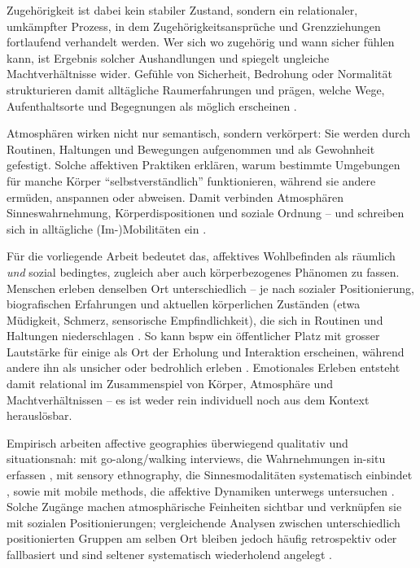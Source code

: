 Zugehörigkeit ist dabei kein stabiler Zustand, sondern ein relationaler, umkämpfter Prozess, in dem Zugehörigkeitsansprüche und Grenzziehungen fortlaufend verhandelt werden. Wer sich wo zugehörig und wann sicher fühlen kann, ist Ergebnis solcher Aushandlungen und spiegelt ungleiche Machtverhältnisse wider. Gefühle von Sicherheit, Bedrohung oder Normalität strukturieren damit alltägliche Raumerfahrungen und prägen, welche Wege, Aufenthaltsorte und Begegnungen als möglich erscheinen \parencite{antonsichSearchingBelongingAnalytical2010,painGlobalizedFearEmotional2009}.

Atmosphären wirken nicht nur semantisch, sondern verkörpert: Sie werden durch Routinen, Haltungen und Bewegungen aufgenommen und als Gewohnheit gefestigt. Solche affektiven Praktiken erklären, warum bestimmte Umgebungen für manche Körper \enquote{selbstverständlich} funktionieren, während sie andere ermüden, anspannen oder abweisen. Damit verbinden Atmosphären Sinneswahrnehmung, Körperdispositionen und soziale Ordnung -- und schreiben sich in alltägliche (Im-)Mobilitäten ein \parencite{mccormackEngineeringAffectiveAtmospheres2008,bissellPassengerMobilitiesAffective2010}.

Für die vorliegende Arbeit bedeutet das, affektives Wohlbefinden als räumlich \emph{und} sozial bedingtes, zugleich aber auch körperbezogenes Phänomen zu fassen. Menschen erleben denselben Ort unterschiedlich -- je nach sozialer Positionierung, biografischen Erfahrungen und aktuellen körperlichen Zuständen (etwa Müdigkeit, Schmerz, sensorische Empfindlichkeit), die sich in Routinen und Haltungen niederschlagen \parencite{mccormackEngineeringAffectiveAtmospheres2008,bissellPassengerMobilitiesAffective2010,ahmedPhenomenologyWhiteness2007}. So kann \gls{bspw} ein öffentlicher Platz mit grosser Lautstärke für einige als Ort der Erholung und Interaktion erscheinen, während andere ihn als unsicher oder bedrohlich erleben \parencite{collectiveSafeSpaceReconceptualization2014}. Emotionales Erleben entsteht damit relational im Zusammenspiel von Körper, Atmosphäre und Machtverhältnissen -- es ist weder rein individuell noch aus dem Kontext herauslösbar.

Empirisch arbeiten affective geographies überwiegend qualitativ und situationsnah: mit go-along/walking interviews, die Wahrnehmungen in-situ erfassen \parencite{kusenbachStreetPhenomenologyGoAlong2003}, mit sensory ethnography, die Sinnesmodalitäten systematisch einbindet \parencite{pinkDoingSensoryEthnography2009}, sowie mit mobile methods, die affektive Dynamiken unterwegs untersuchen \parencite{buscherIntroductionMobileMethods2010}. Solche Zugänge machen atmosphärische Feinheiten sichtbar und verknüpfen sie mit sozialen Positionierungen; vergleichende Analysen zwischen unterschiedlich positionierten Gruppen am selben Ort bleiben jedoch häufig retrospektiv oder fallbasiert und sind seltener systematisch wiederholend angelegt \parencite{hoSocialGeographyIII2024}.

